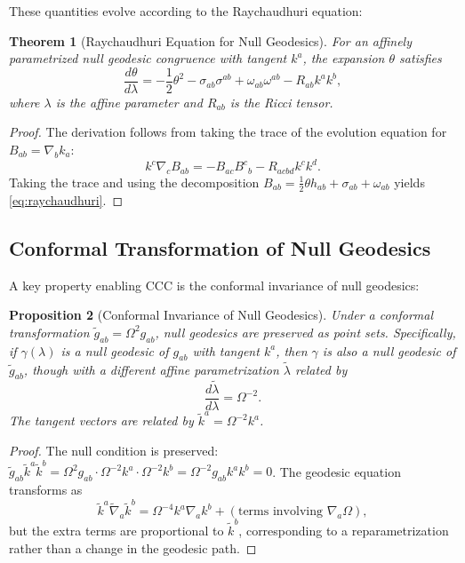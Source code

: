\documentclass[11pt,a4paper]{article}
\theoremstyle{plain}
\newtheorem{theorem}{Theorem}[section]
\newtheorem{proposition}[theorem]{Proposition}
\theoremstyle{definition}
\theoremstyle{remark}
\begin{document}
These quantities evolve according to the Raychaudhuri equation:

\begin{theorem}[Raychaudhuri Equation for Null Geodesics]\label{thm:raychaudhuri}
For an affinely parametrized null geodesic congruence with tangent $k^a$, the expansion $\theta$ satisfies
\begin{equation}\label{eq:raychaudhuri}
    \frac{d\theta}{d\lambda} = -\frac{1}{2}\theta^2 - \sigma_{ab}\sigma^{ab} + \omega_{ab}\omega^{ab} - R_{ab}k^a k^b,
\end{equation}
where $\lambda$ is the affine parameter and $R_{ab}$ is the Ricci tensor.
\end{theorem}

\begin{proof}
The derivation follows from taking the trace of the evolution equation for $B_{ab} = \nabla_b k_a$:
\begin{equation}
    k^c \nabla_c B_{ab} = -B_{ac}B^c{}_b - R_{acbd}k^c k^d.
\end{equation}
Taking the trace and using the decomposition $B_{ab} = \frac{1}{2}\theta h_{ab} + \sigma_{ab} + \omega_{ab}$ yields \eqref{eq:raychaudhuri}.
\end{proof}

\subsection{Conformal Transformation of Null Geodesics}

A key property enabling CCC is the conformal invariance of null geodesics:

\begin{proposition}[Conformal Invariance of Null Geodesics]\label{prop:null_conformal}
Under a conformal transformation $\tilde{g}_{ab} = \Omega^2 g_{ab}$, null geodesics are preserved as point sets. Specifically, if $\gamma(\lambda)$ is a null geodesic of $g_{ab}$ with tangent $k^a$, then $\gamma$ is also a null geodesic of $\tilde{g}_{ab}$, though with a different affine parametrization $\tilde{\lambda}$ related by
\begin{equation}\label{eq:affine_reparam}
    \frac{d\tilde{\lambda}}{d\lambda} = \Omega^{-2}.
\end{equation}
The tangent vectors are related by $\tilde{k}^a = \Omega^{-2} k^a$.
\end{proposition}

\begin{proof}
The null condition is preserved: $\tilde{g}_{ab}\tilde{k}^a\tilde{k}^b = \Omega^2 g_{ab} \cdot \Omega^{-2}k^a \cdot \Omega^{-2}k^b = \Omega^{-2} g_{ab}k^a k^b = 0$. The geodesic equation transforms as
\begin{equation}
    \tilde{k}^a \tilde{\nabla}_a \tilde{k}^b = \Omega^{-4} k^a \nabla_a k^b + (\text{terms involving } \nabla_a \Omega),
\end{equation}
but the extra terms are proportional to $\tilde{k}^b$, corresponding to a reparametrization rather than a change in the geodesic path.
\end{proof}
\end{document}
